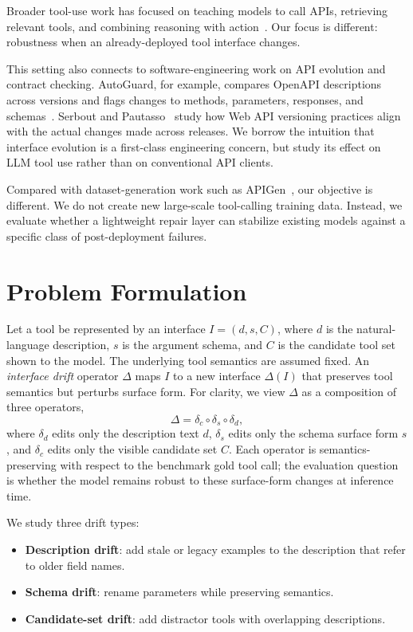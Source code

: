 \documentclass{llncs}
\begin{document}
Broader tool-use work has focused on teaching models to call APIs, retrieving
relevant tools, and combining reasoning with
action~\cite{schick2023toolformer,patil2023gorilla,qin2023toolllm,yao2022react}. Our
focus is different: robustness when an already-deployed tool interface changes.

This setting also connects to software-engineering work on API evolution and
contract checking. AutoGuard, for example, compares OpenAPI descriptions across
versions and flags changes to methods, parameters, responses, and
schemas~\cite{lercher2025autoguard}. Serbout and
Pautasso~\cite{serbout2023versioning} study how Web API versioning practices align with the
actual changes made across releases. We borrow the intuition that interface evolution is a
first-class engineering concern, but study its effect on LLM tool use rather than
on conventional API clients.

Compared with dataset-generation work such as APIGen~\cite{liu2024apigen}, our
objective is different. We do not create new large-scale tool-calling training data.
Instead, we evaluate whether a lightweight repair layer can stabilize existing models
against a specific class of post-deployment failures.

\section{Problem Formulation}
Let a tool be represented by an interface
$I = (d, s, C)$, where $d$ is the natural-language description, $s$ is the argument
schema, and $C$ is the candidate tool set shown to the model. The underlying tool
semantics are assumed fixed. An \emph{interface drift} operator $\Delta$ maps $I$ to
a new interface $\Delta(I)$ that preserves tool semantics but perturbs surface form.
For clarity, we view $\Delta$ as a composition of three operators,
\[
\Delta = \delta_c \circ \delta_s \circ \delta_d,
\]
where $\delta_d$ edits only the description text $d$, $\delta_s$ edits only the
schema surface form $s$, and $\delta_c$ edits only the visible candidate set $C$.
Each operator is semantics-preserving with respect to the benchmark gold tool call;
the evaluation question is whether the model remains robust to these surface-form
changes at inference time.

We study three drift types:
\begin{itemize}
\item \textbf{Description drift}: add stale or legacy examples to the description that
refer to older field names.
\item \textbf{Schema drift}: rename parameters while preserving semantics.
\item \textbf{Candidate-set drift}: add distractor tools with overlapping descriptions.
\end{itemize}
\end{document}

